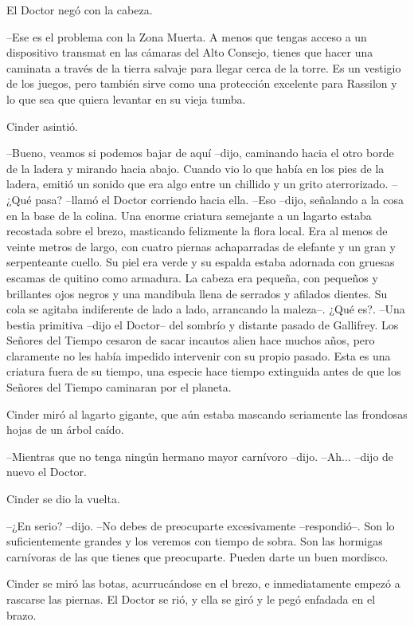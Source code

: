 El Doctor negó con la cabeza. 

--Ese es el problema con la Zona Muerta. A menos que tengas acceso a un dispositivo transmat en las cámaras del Alto Consejo, tienes que hacer una caminata a través de la tierra salvaje para llegar cerca de la torre. Es un vestigio de los juegos, pero también sirve como una protección excelente para Rassilon y lo que sea que quiera levantar en su vieja tumba.

Cinder asintió. 

--Bueno, veamos si podemos bajar de aquí --dijo, caminando hacia el otro borde de la ladera y mirando hacia abajo. Cuando vio lo que había en los pies de la ladera, emitió un sonido que era algo entre un chillido y un grito aterrorizado.
--¿Qué pasa? --llamó el Doctor corriendo hacia ella.
--Eso --dijo, señalando a la cosa en la base de la colina. Una enorme criatura semejante a un lagarto estaba recostada sobre el brezo, masticando felizmente la flora local. Era al menos de veinte metros de largo, con cuatro piernas achaparradas de elefante y un gran y serpenteante cuello. Su piel era verde y su espalda estaba adornada con gruesas escamas de quitino como armadura. La cabeza era pequeña, con pequeños y brillantes ojos negros y una mandibula llena de serrados y afilados dientes. Su cola se agitaba indiferente de lado a lado, arrancando la maleza--. ¿Qué es?.
--Una bestia primitiva --dijo el Doctor-- del sombrío y distante pasado de Gallifrey. Los Señores del Tiempo cesaron de sacar incautos alien hace muchos años, pero claramente no les había impedido intervenir con su propio pasado. Esta es una criatura fuera de su tiempo, una especie hace tiempo extinguida antes de que los Señores del Tiempo caminaran por el planeta.

Cinder miró al lagarto gigante, que aún estaba mascando seriamente las frondosas hojas de un árbol caído. 

--Mientras que no tenga ningún hermano mayor carnívoro --dijo.
--Ah... --dijo de nuevo el Doctor.

Cinder se dio la vuelta. 

--¿En serio? --dijo.
--No debes de preocuparte excesivamente --respondió--. Son lo suficientemente grandes y los veremos con tiempo de sobra. Son las hormigas carnívoras de las que tienes que preocuparte. Pueden darte un buen mordisco.

Cinder se miró las botas, acurrucándose en el brezo, e inmediatamente empezó a rascarse las piernas. El Doctor se rió, y ella se giró y le pegó enfadada en el brazo. 

